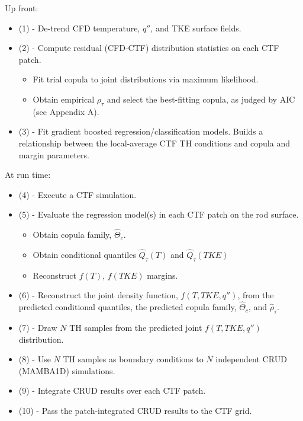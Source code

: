 Up front:
\begin{itemize}
\item (1) - De-trend CFD temperature, $q''$, and TKE surface fields.	
\item (2) - Compute residual (CFD-CTF) distribution statistics on each CTF patch.
	\begin{itemize}
	\item  Fit trial copula to joint distributions via maximum likelihood. 
	\item  Obtain empirical $\rho_\tau$ and select the best-fitting copula, as judged by AIC (see Appendix A). 
	\end{itemize}
\item (3) - Fit gradient boosted regression/classification models.  Builds a relationship between the local-average CTF TH conditions and copula and margin parameters.
\end{itemize}
At run time:
\begin{itemize}
\item (4) - Execute a CTF simulation.
\item (5) - Evaluate the regression model(s) in each CTF patch on the rod surface.
	\begin{itemize}
	\item  Obtain copula family, $\hat \Theta_c$.
	\item  Obtain conditional quantiles $\hat Q_\tau(T)$ and $\hat Q_\tau(TKE)$ 
	\item  Reconstruct $f(T)$, $f(TKE)$ margins.
	\end{itemize}
\item (6) - Reconstruct the joint density function, $f(T, TKE, q'')$, from the predicted conditional quantiles, the predicted copula family, $\hat \Theta_c$, and $\hat \rho_\tau$.
\item (7) - Draw $N$ TH samples from the predicted joint $f(T, TKE, q'')$ distribution.  
\item (8) - Use $N$ TH samples as boundary conditions to $N$ independent CRUD (MAMBA1D) simulations.
\item (9) - Integrate CRUD results over each CTF patch.
\item (10) - Pass the patch-integrated CRUD results to the CTF grid.
\end{itemize}
